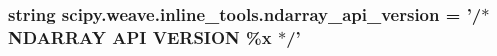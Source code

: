 \subsubsection[{ndarray\+\_\+api\+\_\+version}]{\setlength{\rightskip}{0pt plus 5cm}string scipy.\+weave.\+inline\+\_\+tools.\+ndarray\+\_\+api\+\_\+version = '/$\ast$ N\+D\+A\+R\+R\+A\+Y A\+P\+I {\bf V\+E\+R\+S\+I\+O\+N} \%{\bf x} $\ast$/'}\label{namespacescipy_1_1weave_1_1inline__tools_abf82f23f9d14ab26df489f88195a6d4a}
